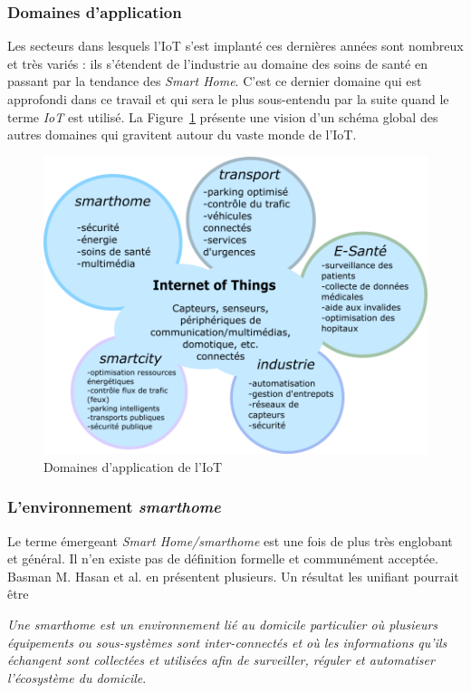 \documentclass[]{article}
\begin{document}
\subsubsection{Domaines d'application}

Les secteurs dans lesquels l'IoT s'est implanté ces dernières années sont nombreux et très variés : ils s'étendent de l'industrie au domaine des soins de santé en passant par la tendance des \textit{Smart Home}. C'est ce dernier domaine qui est approfondi dans ce travail et qui sera le plus sous-entendu par la suite quand le terme \textit{IoT} est utilisé. La Figure~\ref{domains_IoT} présente une vision d'un schéma global des autres domaines qui gravitent autour du vaste monde de l'IoT.\\


\begin{figure}[!h]
\centering
\includegraphics[width=0.6\linewidth]{IoT_domains.png}
\caption{Domaines d'application de l'IoT}
\label{domains_IoT}
\end{figure}

\newpage

\subsubsection{L'environnement \textit{smarthome}}
\par Le terme émergeant \textit{Smart Home/smarthome} est une fois de plus très englobant et général. Il n'en existe pas de définition formelle et communément acceptée. Basman M. Hasan et al. \cite{Basman2016} en présentent plusieurs. Un résultat les unifiant pourrait être
\begin{center}
 \textit{\og Une smarthome est un environnement lié au domicile particulier où plusieurs équipements ou sous-systèmes sont inter-connectés et où les informations qu'ils échangent sont collectées et utilisées afin de surveiller, réguler et automatiser l'écosystème du domicile\fg{}}.\\
\end{center}
\end{document}
